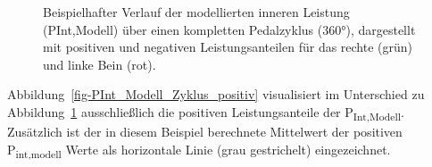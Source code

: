 \documentclass[
  letterpaper,
  DIV=11]{scrartcl}
\begin{document}
\begin{figure}


\caption{\label{fig-PInt_Modell_Zyklus}Beispielhafter Verlauf der
modellierten inneren Leistung (PInt,Modell) über einen kompletten
Pedalzyklus (360°), dargestellt mit positiven und negativen
Leistungsanteilen für das rechte (grün) und linke Bein (rot).}

\end{figure}%

Abbildung~\ref{fig-PInt_Modell_Zyklus_positiv} visualisiert im
Unterschied zu Abbildung~\ref{fig-PInt_Modell_Zyklus} ausschließlich die
positiven Leistungsanteile der P\textsubscript{Int,Modell}. Zusätzlich
ist der in diesem Beispiel berechnete Mittelwert der positiven
P\textsubscript{int,modell} Werte als horizontale Linie (grau
gestrichelt) eingezeichnet.
\end{document}
